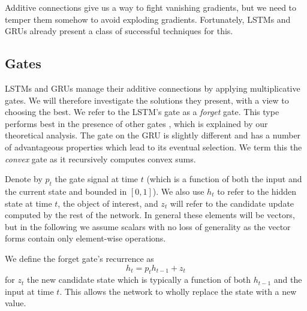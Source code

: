 Additive connections give us a way to fight vanishing gradients, but we need to temper them somehow
to avoid exploding gradients. Fortunately, LSTMs and GRUs already present a class of successful
techniques for this.


\subsection{Gates}\label{sec:gate}
LSTMs and GRUs manage their additive connections by applying multiplicative gates. We will therefore
investigate the solutions they present, with a view to choosing the best. We refer to the LSTM's gate
as a \emph{forget} gate. This type performs best
 in the presence of other gates \autocite{Greff2016, Jozefowicz2015}, which is explained by our 
 theoretical analysis.
The gate on the GRU is slightly
different and has a number of advantageous properties which lead to its eventual selection.
We term this the \emph{convex} gate as it recursively computes convex sums.

Denote by \(p_t\) the gate signal at time \(t\) (which is a
function of both the input and the current state and bounded in \([0, 1]\)). We also use
\(h_t\) to refer to the hidden state at time \(t\), the object of interest, and \(z_t\) will
refer to the candidate update computed by the rest of the network. In general these
elements will be vectors, but in the following we assume scalars with no loss of generality as
the vector forms contain only element-wise operations.

We define the
forget gate's recurrence as
\begin{equation}
	h_t = p_th_{t-1} + z_t
	\label{eq:forgetgate}
\end{equation} for \(z_t\) the new candidate state which is typically a function of
both \(h_{t-1}\) and the input at time \(t\). This allows the network to wholly replace the
state with a new value.

